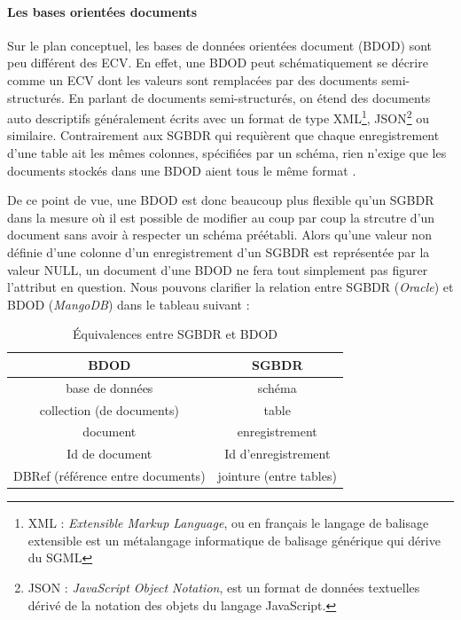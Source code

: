 \documentclass[12pt]{article}
\begin{document}
\paragraph{Les bases orientées documents}
Sur le plan conceptuel, les bases de données orientées document (BDOD) sont peu différent des ECV. En effet, une BDOD peut schématiquement se décrire comme un ECV dont les valeurs sont remplacées par des documents semi-structurés. En parlant de documents semi-structurés, on étend des documents auto descriptifs généralement écrits avec un format de type XML\footnote{XML : \emph{Extensible Markup Language}, ou en français le langage de balisage extensible est un métalangage informatique de balisage générique qui dérive du SGML}, JSON\footnote{JSON : \emph{JavaScript Object Notation}, est un format de données textuelles dérivé de la notation des objets du langage JavaScript.} ou similaire. Contrairement aux SGBDR qui requièrent que chaque enregistrement d'une table ait les mêmes colonnes, spécifiées par un schéma, rien n'exige que les documents stockés dans une BDOD aient tous le même format .\par
De ce point de vue, une BDOD est donc beaucoup plus flexible qu'un SGBDR dans la mesure où il est possible de modifier au coup par coup la strcutre d'un document sans avoir à respecter un schéma préétabli. Alors qu'une valeur non définie d'une colonne d'un enregistrement d'un SGBDR est représentée par la valeur NULL, un document d'une BDOD ne fera tout simplement pas figurer l'attribut en question.
Nous pouvons clarifier la relation entre SGBDR (\emph{Oracle}) et BDOD (\emph{MangoDB}) dans le tableau suivant : 
\begin{table}[]
\centering
\caption{Équivalences entre SGBDR et BDOD}
\begin{tabular}{c|c|}
\hline
\rowcolor[HTML]{C0C0C0} 
\textbf{BDOD}                                           & \textbf{SGBDR}          \\ \hline
\multicolumn{1}{|c|}{base de données}                   & schéma                  \\ \hline
\multicolumn{1}{|c|}{collection (de documents)}         & table                   \\ \hline
\multicolumn{1}{|c|}{document}                          & enregistrement          \\ \hline
\multicolumn{1}{|c|}{Id de document}                    & Id d'enregistrement     \\ \hline
\multicolumn{1}{|c|}{DBRef (référence entre documents)} & jointure (entre tables) \\ \hline
\end{tabular}
\end{table}
\end{document}
